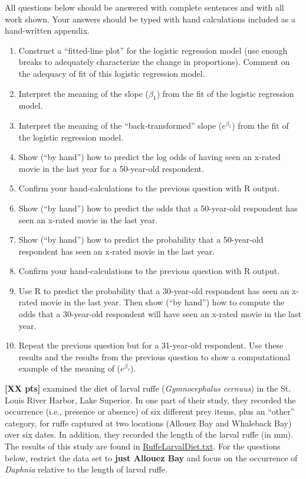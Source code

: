\documentclass[10pt,openany]{book}\usepackage[]{graphicx}\usepackage[]{color}
\begin{document}
\begin{hwsection}{All questions below should be answered with complete sentences and with all work shown.  Your answers should be typed with hand calculations included as a hand-written appendix.}
    \begin{enumerate}
      \item Construct a ``fitted-line plot'' for the logistic regression model (use enough breaks to adequately characterize the change in proportions).  Comment on the adequacy of fit of this logistic regression model.
      \item Interpret the meaning of the slope ($\beta_{1}$) from the fit of the logistic regression model.
      \item Interpret the meaning of the ``back-transformed'' slope ($e^{\beta_{1}}$) from the fit of the logistic regression model.
      \item Show (``by hand'') how to predict the log odds of having seen an x-rated movie in the last year for a 50-year-old respondent.
      \item Confirm your hand-calculations to the previous question with R output.
      \item Show (``by hand'') how to predict the odds that a 50-year-old respondent has seen an x-rated movie in the last year.
      \item Show (``by hand'') how to predict the probability that a 50-year-old respondent has seen an x-rated movie in the last year.
      \item Confirm your hand-calculations to the previous question with R output.
      \item Use R to predict the probability that a 30-year-old respondent has seen an x-rated movie in the last year.  Then show (``by hand'') how to compute the odds that a 30-year-old respondent will have seen an x-rated movie in the last year.
      \item Repeat the previous question but for a 31-year-old respondent.  Use these results and the results from the previous question to show a computational example of the meaning of ($e^{\beta_{1}}$).
    \end{enumerate}

\newpage
  \item \label{hwprob:LMlogisticRuffe1} \textbf{[XX pts]}  \cite{Ogleetal2004} examined the diet of larval ruffe (\emph{Gymnocephalus cernuus}) in the St. Louis River Harbor, Lake Superior.  In one part of their study, they recorded the occurrence (i.e., presence or absence) of six different prey items, plus an ``other'' category, for ruffe captured at two locations (Allouez Bay and Whaleback Bay) over six dates.  In addition, they recorded the length of the larval ruffe (in mm).  The results of this study are found in \href{https://sites.google.com/site/ncstats/data/RuffeLarvalDiet.txt}{RuffeLarvalDiet.txt}.  For the questions below, restrict the data set to \textbf{just Allouez Bay} and focus on the occurrence of \emph{Daphnia} relative to the length of larval ruffe.


\end{hwsection}
\end{document}
